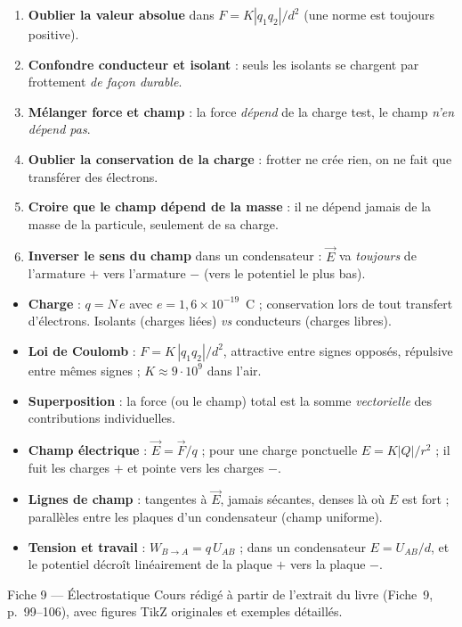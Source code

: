 \documentclass[11pt,a4paper]{article}
\newcommand{\vc}[1]{\vec{#1}}
\begin{document}
\begin{attention}
\begin{enumerate}[leftmargin=1.8em,topsep=2pt,itemsep=1pt]
  \item \textbf{Oublier la valeur absolue} dans $F = K|q_1 q_2|/d^2$ (une norme est toujours
        positive).
  \item \textbf{Confondre conducteur et isolant} : seuls les isolants se chargent par frottement
        \emph{de façon durable}.
  \item \textbf{Mélanger force et champ} : la force \emph{dépend} de la charge test, le champ
        \emph{n'en dépend pas}.
  \item \textbf{Oublier la conservation de la charge} : frotter ne crée rien, on ne fait que
        transférer des électrons.
  \item \textbf{Croire que le champ dépend de la masse} : il ne dépend jamais de la masse de la
        particule, seulement de sa charge.
  \item \textbf{Inverser le sens du champ} dans un condensateur : $\vc{E}$ va \emph{toujours} de
        l'armature $+$ vers l'armature $-$ (vers le potentiel le plus bas).
\end{enumerate}
\end{attention}

\begin{tcolorbox}[boxbase,colback=primarydark!6,colframe=primarydark,
   title={\textsc{L'essentiel de la Fiche 9}}]
\begin{itemize}[leftmargin=1.5em,topsep=2pt,itemsep=2pt]
  \item \textbf{Charge} : $q = N\,e$ avec $e = 1{,}6\times 10^{-19}$~C ; conservation lors de tout
        transfert d'électrons. Isolants (charges liées) \emph{vs} conducteurs (charges libres).
  \item \textbf{Loi de Coulomb} : $F = K\,|q_1 q_2|/d^{2}$, attractive entre signes opposés,
        répulsive entre mêmes signes ; $K\approx 9\!\cdot\!10^{9}$ dans l'air.
  \item \textbf{Superposition} : la force (ou le champ) total est la somme \emph{vectorielle} des
        contributions individuelles.
  \item \textbf{Champ électrique} : $\vc{E} = \vc{F}/q$ ; pour une charge ponctuelle
        $E = K|Q|/r^{2}$ ; il fuit les charges $+$ et pointe vers les charges $-$.
  \item \textbf{Lignes de champ} : tangentes à $\vc{E}$, jamais sécantes, denses là où $E$ est
        fort ; parallèles entre les plaques d'un condensateur (champ uniforme).
  \item \textbf{Tension et travail} : $W_{B\to A} = q\,U_{AB}$ ; dans un condensateur
        $E = U_{AB}/d$, et le potentiel décroît linéairement de la plaque $+$ vers la plaque $-$.
\end{itemize}
\end{tcolorbox}

\vspace{0.3cm}
\begin{center}
\small\color{black!55}
Fiche 9 — Électrostatique \quad\textbullet\quad Cours rédigé à partir de l'extrait du livre
(Fiche~9, p.~99--106), avec figures TikZ originales et exemples détaillés.
\end{center}
\end{document}
